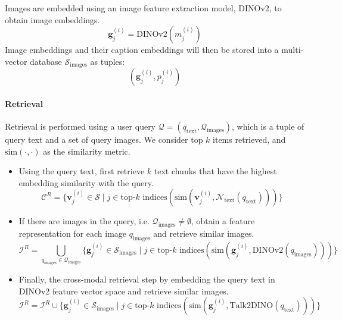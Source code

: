 Images are embedded using an image feature extraction model, DINOv2, to obtain image embeddings.
\begin{equation}
    \mathbf{g}_j^{(i)} = \mathrm{DINOv2}(m_j^{(i)})
\end{equation}
Image embeddings and their caption embeddings will then be stored into a multi-vector database $\mathcal{S}_{\text{images}}$ as tuples:
\begin{equation}
    \left(\mathbf{g}_j^{(i)}, p_j^{(i)}\right)
\end{equation}

\paragraph{Retrieval}
Retrieval is performed using a user query $\mathcal{Q} = \left(q_{\text{text}}, \mathcal{Q}_{\text{images}}\right)$, 
which is a tuple of query text and a set of query images.
We consider top $k$ items retrieved, and $\mathrm{sim}(\cdot, \cdot)$ as the similarity metric.

\begin{itemize}
    \item Using the query text, first retrieve $k$ text chunks that have the highest embedding similarity with the query.
        \begin{equation}
            \mathcal{C}^R = \{\mathbf{v}_j^{(i)} \in \mathcal{S} \mid j \in \text{top-}k \text{ indices} (\mathrm{sim}(\mathbf{v}_j^{(i)}, \mathcal{N}_{\text{text}}(q_{\text{text}})))\}
        \end{equation}
    \item If there are images in the query, i.e. $\mathcal{Q}_{\text{images}} \neq \emptyset$, obtain a feature representation for each image $q_{\text{images}}$ and retrieve similar images.
        \begin{equation}
            \mathcal{I}^R = \bigcup_{q_{\text{images}} \in \mathcal{Q}_{\text{images}}} \{\mathbf{g}_j^{(i)} \in \mathcal{S}_{\text{images}} \mid j \in \text{top-}k \text{ indices} (\mathrm{sim}(\mathbf{g}_j^{(i)}, \mathrm{DINOv2}(q_{\text{images}})))\}
        \end{equation}
    \item Finally, the cross-modal retrieval step by embedding the query text in DINOv2 feature vector space and retrieve similar images.
        \begin{equation}
            \mathcal{I}^R = \mathcal{I}^R \cup \{\mathbf{g}_j^{(i)} \in \mathcal{S}_{\text{images}} \mid j \in \text{top-}k \text{ indices} (\mathrm{sim}(\mathbf{g}_j^{(i)}, \mathrm{Talk2DINO}(q_{\text{text}})))\}
        \end{equation}
\end{itemize}

